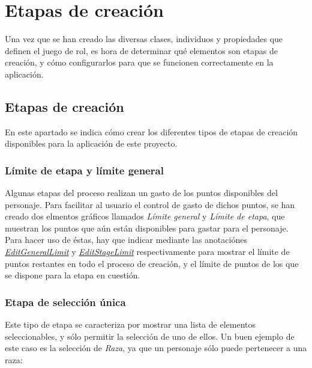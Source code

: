 
\section{Etapas de creación}
Una vez que se han creado las diversas clases, individuos y propiedades que definen el juego de rol, es hora de 
determinar qué elementos son etapas de creación, y cómo configurarlos para que se funcionen correctamente en la aplicación.

\subsection{Etapas de creación}
En este apartado se indica cómo crear los diferentes tipos de etapas de creación disponibles para la aplicación de este proyecto.

\subsubsection{Límite de etapa y límite general}
Algunas etapas del proceso realizan un gasto de los puntos disponibles del personaje. Para facilitar al usuario el control 
de gasto de dichos puntos, se han creado dos elmentos gráficos llamados \textit{Límite general} y \textit{Límite de etapa}, 
que muestran los puntos que aún están disponibles para gastar para el personaje. Para hacer uso de éstas, 
hay que indicar mediante las anotaciónes \textit{\underline{EditGeneralLimit}} y \textit{\underline{EditStageLimit}} respectivamente
para mostrar el límite de puntos restantes en todo el proceso de creación, y el límite de puntos de los que se dispone para la 
etapa en cuestión.

\subsubsection{Etapa de selección única}
Este tipo de etapa se caracteriza por mostrar una lista de elementos seleccionables, y sólo permitir la selección de uno de ellos.
Un buen ejemplo de este caso es la selección de \textit{Raza}, ya que un personaje sólo puede pertenecer a una raza:

